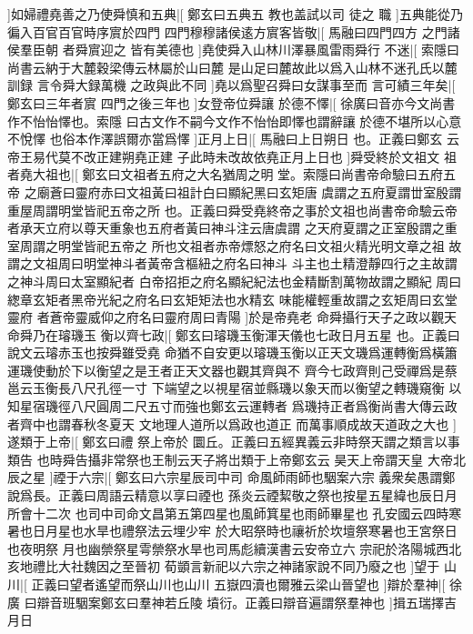 %
]如婦禮堯善之乃使舜慎和五典|[%
鄭玄曰五典五%
教也盖試以司%
%
徒之%
職%
]五典能從乃徧入百官百官時序賔於四門%
%
四門穆穆諸侯逺方賔客皆敬|[%
馬融曰四門四方%
之門諸侯羣臣朝%
%
者舜賔迎之%
皆有美德也%
]堯使舜入山林川澤暴風雷雨舜行%
%
不迷|[%
索隱曰尚書云納于大麓穀梁傳云林屬於山曰麓%
是山足曰麓故此以爲入山林不迷孔氏以麓訓録%
%
言令舜大録萬機%
之政與此不同%
]堯以爲聖召舜曰女謀事至而%
%
言可績三年矣|[%
鄭玄曰三年者賔%
四門之後三年也%
]女登帝位舜讓%
%
於德不懌|[%
徐廣曰音亦今文尚書作不怡怡懌也。索隱%
曰古文作不嗣今文作不怡怡即懌也謂辭讓%
%
於德不堪所以心意不悅懌%
也俗本作澤誤爾亦當爲懌%
]正月上日|[%
馬融曰上日朔日%
也。正義曰鄭玄%
%
云帝王易代莫不改正建朔堯正建%
子此時未改故依堯正月上日也%
]舜受終於文祖文%
%
祖者堯大祖也|[%
鄭玄曰文祖者五府之大名猶周之明%
堂。索隱曰尚書帝命驗曰五府五帝%
%
之廟蒼曰靈府赤曰文祖黃曰祖計白曰顯紀黑曰玄矩唐%
虞謂之五府夏謂丗室殷謂重屋周謂明堂皆祀五帝之所%
%
也。正義曰舜受堯終帝之事於文祖也尚書帝命驗云帝%
者承天立府以尊天重象也五府者黃曰神斗注云唐虞謂%
%
之天府夏謂之正室殷謂之重室周謂之明堂皆祀五帝之%
所也文祖者赤帝熛怒之府名曰文祖火精光明文章之祖%
%
故謂之文祖周曰明堂神斗者黃帝含樞紐之府名曰神斗%
斗主也土精澄靜四行之主故謂之神斗周曰太室顯紀者%
%
白帝招拒之府名顯紀紀法也金精斷割萬物故謂之顯紀%
周曰緫章玄矩者黑帝光紀之府名曰玄矩矩法也水精玄%
%
味能權輕重故謂之玄矩周曰玄堂靈府%
者蒼帝靈威仰之府名曰靈府周曰青陽%
]於是帝堯老%
%
命舜攝行天子之政以觀天命舜乃在璿璣玉%
%
衡以齊七政|[%
鄭玄曰璿璣玉衡渾天儀也七政日月五星%
也。正義曰說文云璿赤玉也按舜雖受堯%
%
命猶不自安更以璿璣玉衡以正天文璣爲運轉衡爲橫簫%
運璣使動於下以衡望之是王者正天文器也觀其齊與不%
%
齊今七政齊則己受禪爲是蔡邕云玉衡長八尺孔徑一寸%
下端望之以視星宿並縣璣以象天而以衡望之轉璣窺衡%
%
以知星宿璣徑八尺圓周二尺五寸而強也鄭玄云運轉者%
爲璣持正者爲衡尚書大傳云政者齊中也謂春秋冬夏天%
%
文地理人道所以爲政也道正%
而萬事順成故天道政之大也%
]遂類于上帝|[%
鄭玄曰禮%
祭上帝於%
%
圜丘。正義曰五經異義云非時祭天謂之類言以事類告%
也時舜告攝非常祭也王制云天子將岀類于上帝鄭玄云%
%
昊天上帝謂天皇%
大帝北辰之星%
]禋于六宗|[%
鄭玄曰六宗星辰司中司%
命風師雨師也駰案六宗%
%
義衆矣愚謂鄭說爲長。正義曰周語云精意以享曰禋也%
孫炎云禋絜敬之祭也按星五星緯也辰日月所會十二次%
%
也司中司命文昌第五第四星也風師箕星也雨師畢星也%
孔安國云四時寒暑也日月星也水旱也禮祭法云埋少牢%
%
於大昭祭時也禳祈於坎壇祭寒暑也王宮祭日也夜明祭%
月也幽禜祭星雩禜祭水旱也司馬彪續漢書云安帝立六%
%
宗祀於洛陽城西北亥地禮比大社魏因之至晉初%
荀顗言新祀以六宗之神諸家說不同乃廢之也%
]望于%
%
山川|[%
正義曰望者遙望而祭山川也山川%
五嶽四瀆也爾雅云梁山晉望也%
]辯於羣神|[%
徐%
廣%
%
曰辯音班駰案鄭玄曰羣神若丘陵%
墳衍。正義曰辯音遍謂祭羣神也%
]揖五瑞擇吉月日%
